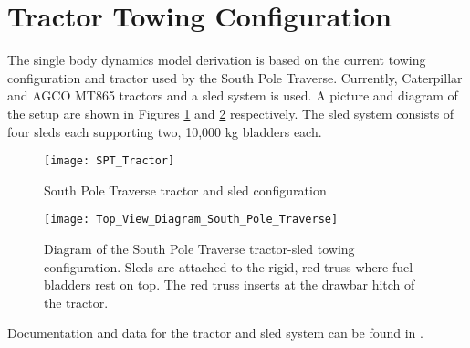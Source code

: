 \section{Tractor Towing Configuration}
The single body dynamics model derivation is based on the current towing configuration and tractor used by the South Pole Traverse. Currently, Caterpillar and AGCO MT865 tractors and a sled system is used. A picture and diagram of the setup are shown in Figures \ref{fig:South_Pole_Traverse_Tractor_and_Sled_Configuration} and \ref{fig:Top_View_Diagram_South_Pole_Traverse} respectively. The sled system consists of four sleds each supporting two, 10,000 kg bladders each. 
\begin{figure}[t]
    \centering
    \texttt{[image: SPT\_Tractor]}
    \caption{South Pole Traverse tractor and sled configuration}
    \label{fig:South_Pole_Traverse_Tractor_and_Sled_Configuration}
\end{figure}
\begin{figure}[t]
    \centering
    \texttt{[image: Top\_View\_Diagram\_South\_Pole\_Traverse]}
    \caption{Diagram of the South Pole Traverse tractor-sled towing configuration. Sleds are attached to the rigid, red truss where fuel bladders rest on top. The red truss inserts at the drawbar hitch of the tractor.}
    \label{fig:Top_View_Diagram_South_Pole_Traverse}
\end{figure} 
Documentation and data for the tractor and sled system can be found in \cite{lever2012high, Caterpillar2002}.